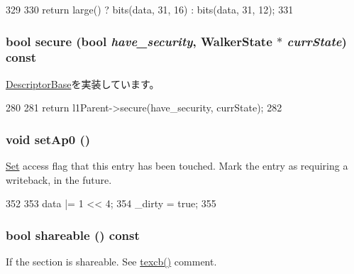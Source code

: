 \begin{DoxyCode}
329         {
330             return large() ? bits(data, 31, 16) : bits(data, 31, 12);
331         }
\end{DoxyCode}
\hypertarget{classArmISA_1_1TableWalker_1_1L2Descriptor_a183500f0404847b8d9ea66ef3cba6ca5}{
\subsubsection[{secure}]{\setlength{\rightskip}{0pt plus 5cm}bool secure (bool {\em have\_\-security}, \/  {\bf WalkerState} $\ast$ {\em currState}) const}}
\label{classArmISA_1_1TableWalker_1_1L2Descriptor_a183500f0404847b8d9ea66ef3cba6ca5}


\hyperlink{classArmISA_1_1TableWalker_1_1DescriptorBase_ab436e8aede9276b99fb2e8eac6d784a3}{DescriptorBase}を実装しています。


\begin{DoxyCode}
280         {
281             return l1Parent->secure(have_security, currState);
282         }
\end{DoxyCode}
\hypertarget{classArmISA_1_1TableWalker_1_1L2Descriptor_ae309fe90579f95e8236119ad4e4b89c6}{
\subsubsection[{setAp0}]{\setlength{\rightskip}{0pt plus 5cm}void setAp0 ()}}
\label{classArmISA_1_1TableWalker_1_1L2Descriptor_ae309fe90579f95e8236119ad4e4b89c6}
\hyperlink{classSet}{Set} access flag that this entry has been touched. Mark the entry as requiring a writeback, in the future. 


\begin{DoxyCode}
352         {
353             data |= 1 << 4;
354             _dirty = true;
355         }
\end{DoxyCode}
\hypertarget{classArmISA_1_1TableWalker_1_1L2Descriptor_a9b831498b02d6b485c2b15f33ccd0582}{
\subsubsection[{shareable}]{\setlength{\rightskip}{0pt plus 5cm}bool shareable () const}}
\label{classArmISA_1_1TableWalker_1_1L2Descriptor_a9b831498b02d6b485c2b15f33ccd0582}
If the section is shareable. See \hyperlink{classArmISA_1_1TableWalker_1_1L2Descriptor_a2f3e1adbe4ca1fa91c6c12f35828dd73}{texcb()} comment. 


